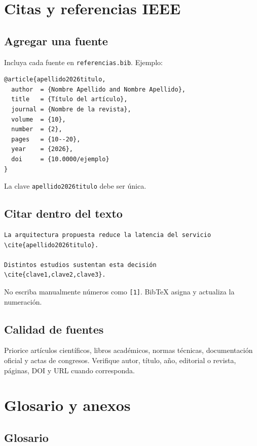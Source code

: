 \documentclass[12pt,a4paper,oneside]{report}
\begin{document}
\chapter{Citas y referencias IEEE}

\section{Agregar una fuente}

Incluya cada fuente en \texttt{referencias.bib}. Ejemplo:

\begin{lstlisting}
@article{apellido2026titulo,
  author  = {Nombre Apellido and Nombre Apellido},
  title   = {Título del artículo},
  journal = {Nombre de la revista},
  volume  = {10},
  number  = {2},
  pages   = {10--20},
  year    = {2026},
  doi     = {10.0000/ejemplo}
}
\end{lstlisting}

La clave \texttt{apellido2026titulo} debe ser única.

\section{Citar dentro del texto}

\begin{lstlisting}
La arquitectura propuesta reduce la latencia del servicio \cite{apellido2026titulo}.

Distintos estudios sustentan esta decisión \cite{clave1,clave2,clave3}.
\end{lstlisting}

No escriba manualmente números como \texttt{[1]}. BibTeX asigna y actualiza la numeración.

\section{Calidad de fuentes}

Priorice artículos científicos, libros académicos, normas técnicas, documentación oficial y actas de congresos. Verifique autor, título, año, editorial o revista, páginas, DOI y URL cuando corresponda.

\chapter{Glosario y anexos}

\section{Glosario}
\end{document}
